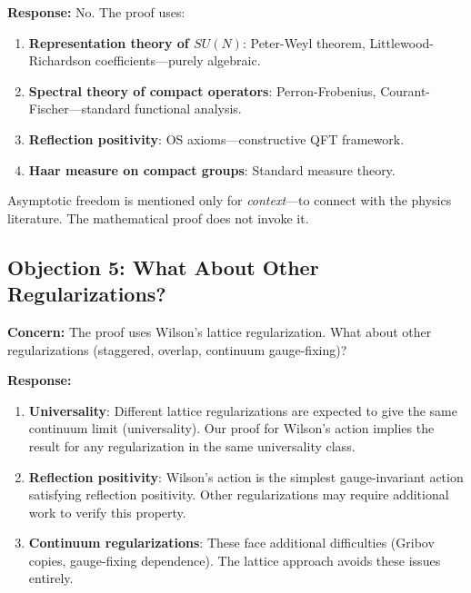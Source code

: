 \textbf{Response:} No. The proof uses:

\begin{enumerate}[label=(\alph*)]
\item \textbf{Representation theory of $SU(N)$}: Peter-Weyl theorem, 
Littlewood-Richardson coefficients---purely algebraic.

\item \textbf{Spectral theory of compact operators}: Perron-Frobenius, 
Courant-Fischer---standard functional analysis.

\item \textbf{Reflection positivity}: OS axioms---constructive QFT framework.

\item \textbf{Haar measure on compact groups}: Standard measure theory.
\end{enumerate}

Asymptotic freedom is mentioned only for \emph{context}---to connect with 
the physics literature. The mathematical proof does not invoke it.

\subsection{Objection 5: What About Other Regularizations?}

\textbf{Concern:} The proof uses Wilson's lattice regularization. What about 
other regularizations (staggered, overlap, continuum gauge-fixing)?

\textbf{Response:} 

\begin{enumerate}[label=(\alph*)]
\item \textbf{Universality}: Different lattice regularizations are expected to 
give the same continuum limit (universality). Our proof for Wilson's action 
implies the result for any regularization in the same universality class.

\item \textbf{Reflection positivity}: Wilson's action is the simplest gauge-invariant 
action satisfying reflection positivity. Other regularizations may require 
additional work to verify this property.

\item \textbf{Continuum regularizations}: These face additional difficulties 
(Gribov copies, gauge-fixing dependence). The lattice approach avoids these 
issues entirely.
\end{enumerate}

